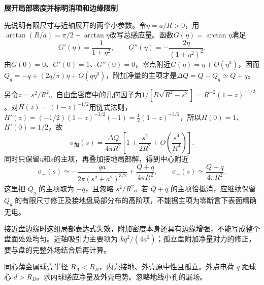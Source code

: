 \begin{solution}
\par\medskip{}\noindent\textbf{展开局部密度并标明消项和边缘限制}\par\nobreak
先说明有限尺寸与近轴展开的两个小参数。令$\eta=a/R>0$，用$\arctan(R/a)=\pi/2-\arctan\eta$改写总感应量。函数$G(\eta)=\arctan\eta$满足
\[
G'(\eta)=\frac1{1+\eta^2},\qquad
G''(\eta)=-\frac{2\eta}{(1+\eta^2)^2}.
\]
由$G(0)=0$、$G'(0)=1$、$G''(0)=0$，零点附近$G(\eta)=\eta+O(\eta^3)$，因而$Q_g=-q+(2q/\pi)\eta+O(q\eta^3)$，附加净量的主项才是$\Delta Q=Q-Q_g\simeq Q+q$。

另令$z=s^2/R^2$。自由盘密度中的几何因子为$1/[R\sqrt{R^2-s^2}]=R^{-2}(1-z)^{-1/2}$。对$H(z)=(1-z)^{-1/2}$用链式法则，$H'(z)=(-1/2)(1-z)^{-3/2}(-1)=\tfrac12(1-z)^{-3/2}$，所以$H(0)=1$、$H'(0)=1/2$，故
\[
\sigma_{\text{加}}(s)=\frac{\Delta Q}{4\pi R^2}
\left[1+\frac{s^2}{2R^2}+O\!\left(\frac{s^4}{R^4}\right)\right].
\]
同时只保留$\eta$和$z$的主项，再叠加接地局部解，得到中心附近
\[
 \sigma_+(s)\simeq-\frac{qa}{2\pi(s^2+a^2)^{3/2}}
 +\frac{Q+q}{4\pi R^2},\qquad
 \sigma_-(s)\simeq\frac{Q+q}{4\pi R^2}.
\]
这里把 $Q_g$ 的主项取为 $-q$，且忽略 $s^2/R^2$。若 $Q+q$ 的主项恰抵消，应继续保留 $Q_g$ 的有限尺寸修正及接地盘局部分布的高阶项，不能据主项为零断言下表面精确无电。

接近盘边缘时这组局部表达式失效，附加密度本身还具有边缘增强，不能写成整个盘面处处均匀。近轴吸引力主要项为 $kq^2/(4a^2)$；孤立盘附加净量对力的修正，要与盘的完整外场结合后再计算。\end{solution}
\begin{question}\begin{example}[内球接地而外壳附近有点电荷]\label{e3:example:12}
同心薄金属球壳半径 $R_A<R_B$，内壳接地、外壳原中性且孤立。外点电荷 $q$ 距球心 $d>R_B$。求内球感应净量及外壳电势。忽略地线小孔的漏场。
\end{example}
\end{question}
